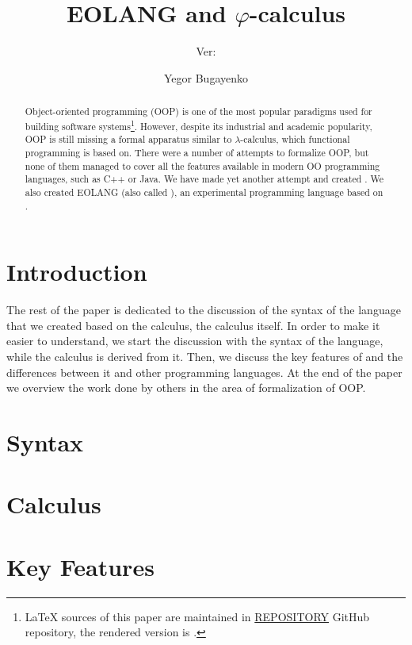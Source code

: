\documentclass[sigplan,nonacm]{acmart}
\title{EOLANG and \texorpdfstring{\(\varphi\)}{phi}-calculus}
\subtitle{%
  Ver:
  \texorpdfstring{
    \href{https://github.com/REPOSITORY/releases/tag/0.0.0}
      {\ff{0.0.0}}
  }{0.0.0}
}
\author{Yegor Bugayenko}
\affiliation{
  \institution{Huawei}
  \city{Moscow}
  \country{Russia}
}
\begin{document}
\begin{abstract}
Object-oriented programming (OOP) is one of the most popular
paradigms used for building software systems\footnote{%
  \LaTeX{} sources of this paper are maintained in
  \href{https://github.com/REPOSITORY}{REPOSITORY} GitHub repository,
  the rendered version is \href{https://github.com/REPOSITORY/releases/tag/0.0.0}{}.}.
However, despite
its industrial and academic popularity, OOP is still missing
a formal apparatus similar to \(\lambda\)-calculus, which functional
programming is based on. There were a number of attempts to formalize
OOP, but none of them managed to cover all the features available in
modern OO programming languages, such as C++ or Java.
We have made yet another attempt and created \phic{}. We also
created EOLANG (also called \eolang{}), an experimental
programming language based on \phic{}.
\end{abstract}

\maketitle

\section{Introduction}
\label{sec:intro}


The rest of the paper is dedicated to the discussion of the syntax of the language that we created based on the calculus, the calculus itself.
In order to make it easier to understand, we start the discussion with the syntax of the language, while the calculus is derived from it.
Then, we discuss the key features of \eolang{} and the differences between it and other programming languages.
At the end of the paper we overview the work done by others in the area of formalization of OOP.

\section{Syntax}
\label{sec:syntax}


\section{Calculus}
\label{sec:calculus}


\section{Key Features}
\label{sec:features}

\end{document}
